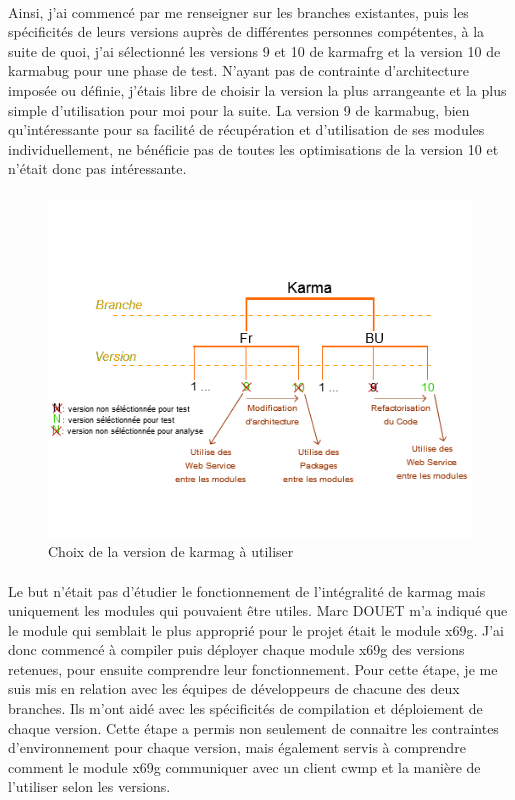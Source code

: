 \documentclass[12pt,a4paper]{report}
\begin{document}
\paragraph*{}Ainsi, j’ai commencé par me renseigner sur les branches existantes, puis
les spécificités de leurs versions auprès de différentes personnes compétentes, à la suite de quoi, j’ai sélectionné les versions 9 et 10 de \gls{karmafrg} et la version 10 de \gls{karmabug} pour une phase de test. N’ayant pas de contrainte d’architecture imposée ou définie, j’étais libre de choisir la version la plus arrangeante et la plus simple d’utilisation pour moi pour la suite. La version 9 de \gls{karmabug}, bien qu’intéressante pour sa facilité de récupération et d’utilisation de ses modules individuellement, ne bénéficie pas de toutes les optimisations de la version 10 et n’était donc pas intéressante.
\paragraph*{}
\begin{figure}[!ht]
    \center
    \includegraphics[scale=0.9]{./img/choix_karma.png}
    \caption{Choix de la version de \gls{karmag} à utiliser}
\end{figure}
\paragraph*{}Le but n’était pas d’étudier le fonctionnement de l’intégralité de \gls{karmag} mais uniquement les modules qui pouvaient être utiles. Marc DOUET m’a indiqué que le module qui semblait le plus approprié pour le projet était le module \gls{x69g}. J’ai donc commencé à compiler puis déployer chaque module \gls{x69g} des versions retenues, pour ensuite comprendre leur fonctionnement. Pour cette étape, je me suis mis en relation avec les équipes de développeurs de chacune des deux branches. Ils m’ont aidé avec les spécificités de compilation et déploiement de chaque version. Cette étape a permis non seulement de connaitre les contraintes d’environnement pour chaque version, mais également servis à comprendre comment le module \gls{x69g} communiquer avec un client \gls{cwmp} et la manière de l’utiliser selon les versions.
\end{document}
